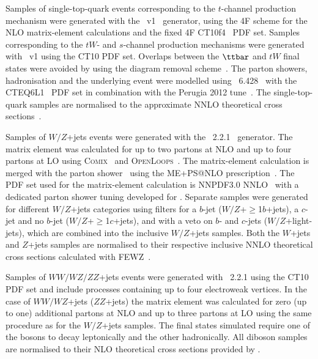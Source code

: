 Samples of single-top-quark events corresponding to the $t$-channel production mechanism were generated with the 
{\powheg}~v1~\cite{Frederix:2012dh} generator, using the 4F scheme  for the NLO matrix-element calculations
and the fixed 4F \textsc{CT10}f\textsc{4}~\cite{Lai:2010vv} PDF set.
Samples corresponding to the $tW$- and $s$-channel production mechanisms were generated 
with {\powheg}~v1 using the CT10 PDF set. Overlaps between the $\ttbar$ and $tW$ final states were avoided by using 
the diagram removal scheme~\cite{Frixione:2005vw}.
The parton showers, hadronisation and the underlying event were modelled using {\pythia}~6.428~\cite{Sjostrand:2006za} 
with the CTEQ6L1~\cite{Pumplin:2002vw,Nadolsky:2008zw} PDF set 
in combination with the Perugia 2012 tune~\cite{Skands:2010ak}.
The single-top-quark samples are normalised to the approximate NNLO theoretical cross 
sections~\cite{Kidonakis:2011wy,Kidonakis:2010ux,Kidonakis:2010tc}. 

Samples of $W/Z$+jets events were generated with the {\sherpa}~2.2.1~\cite{Gleisberg:2008ta} generator. 
The matrix element was calculated for up to two partons at NLO and up to four partons at LO using 
\textsc{Comix}~\cite{Gleisberg:2008fv} and \textsc{OpenLoops}~\cite{Cascioli:2011va}. The matrix-element calculation 
is merged with the {\sherpa} parton shower~\cite{Schumann:2007mg} using the ME+PS@NLO prescription~\cite{Hoeche:2012yf}. 
The PDF set used for the matrix-element calculation is NNPDF3.0 NNLO~\cite{Ball:2014uwa} with a dedicated parton shower tuning developed for {\sherpa}. 
Separate samples were generated for different $W/Z$+jets categories using filters for a $b$-jet 
($W/Z$+$\geq$1$b$+jets), a $c$-jet and no $b$-jet ($W/Z$+$\geq$1$c$+jets), and with a veto on $b$- and $c$-jets 
($W/Z$+light-jets), which are combined into the inclusive $W/Z$+jets samples.
Both the $W$+jets and $Z$+jets samples are normalised to their respective inclusive NNLO theoretical 
cross sections calculated with \textsc{FEWZ}~\cite{Anastasiou:2003ds}.

Samples of $WW/WZ/ZZ$+jets events were generated with {\sherpa}~2.2.1 using the CT10 PDF set
and include processes containing up to four electroweak vertices. 
In the case of $WW/WZ$+jets ($ZZ$+jets) the matrix element was calculated for zero (up to one) additional partons 
at NLO and up to three partons at LO using the same procedure as for the $W/Z$+jets samples. 
The final states simulated require one of the bosons to decay leptonically and the other hadronically.
All diboson samples are normalised to their NLO theoretical cross sections provided by {\sherpa}. 

